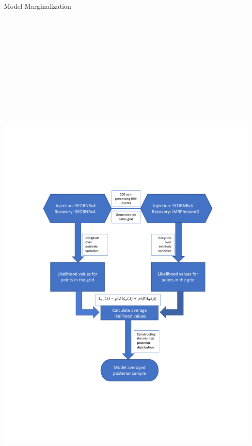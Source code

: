 \documentclass[serif]{beamer}
\begin{document}
\begin{frame}{}
\begin{columns}
\begin{column}[T]{0.3\textwidth}
\begin{block}{Model Marginalization}
\vspace{-3.5em}
\begin{center}
\includegraphics[width=330mm, height=300mm]{Images/Flow_chart}
\end{center}
\vspace{-4.4em}


\end{block}
\end{column}
\end{columns}
\end{frame}
\end{document}
